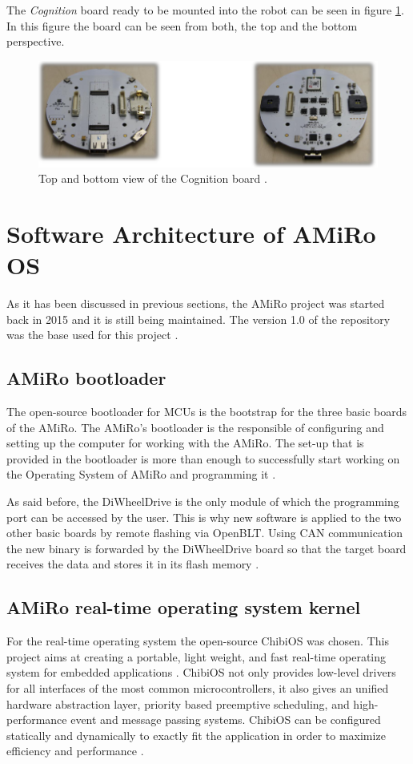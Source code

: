 \documentclass[12pt]{report}%
\begin{document}
The \textit{Cognition} board ready to be mounted into the robot can be seen in figure \ref{fig:cogb}. In this figure the board can be seen from both, the top and the bottom perspective.

\begin{figure}[ht]
	\centering
	\includegraphics[width=\textwidth]{cognition_real}
    \caption{Top and bottom view of the Cognition board \cite{AMiRo_ppt_v2}.}
    \label{fig:cogb}
\end{figure}
\clearpage

\section{Software Architecture of AMiRo OS}
\label{sec:soft}
As it has been discussed in previous sections, the AMiRo project was started back in 2015 and it is still being maintained. The version 1.0 of the repository was the base used for this project \cite{AMiRo_Git}.

\subsection{AMiRo bootloader}
\label{sub:btl}
The open-source bootloader for MCUs is the bootstrap for the three basic boards of the AMiRo. The AMiRo's bootloader is the responsible of configuring and setting up the computer for working with the AMiRo. The set-up that is provided in the bootloader is more than enough to successfully start working on the Operating System of AMiRo and programming it \cite{btl}.

As said before, the DiWheelDrive is the only module of which the programming port can be accessed by the user. This is why new software is applied to the two other basic boards by remote flashing via OpenBLT. Using CAN communication the new binary is forwarded by the DiWheelDrive board so that the target board receives the data and stores it in its flash memory \cite{AMiRo_paper_modular}.

\subsection{AMiRo real-time operating system kernel}
For the real-time operating system the open-source ChibiOS was chosen. This project aims at creating a portable, light weight, and fast real-time operating system for embedded applications \cite{chibioshp}. ChibiOS not only provides low-level drivers for all interfaces of the most common microcontrollers, it also gives an unified hardware abstraction layer, priority based preemptive scheduling, and high-performance event and message passing systems. ChibiOS can be configured statically and dynamically to exactly fit the application in order to maximize efficiency and performance \cite{AMiRo_paper_modular}.
\end{document}

